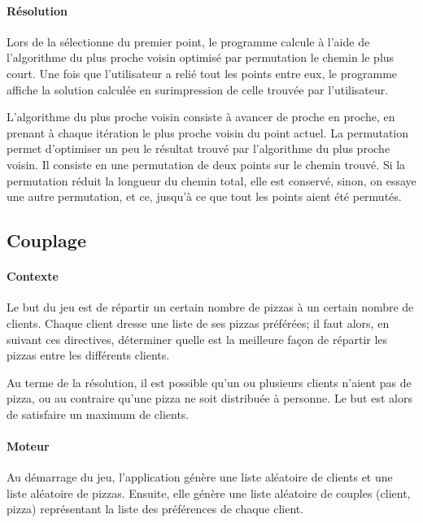         \paragraph{Résolution}
            Lors de la sélectionne du premier point,
            le programme calcule à l'aide de l'algorithme
            du plus proche voisin optimisé par permutation
            le chemin le plus court.
            Une fois que l'utilisateur a relié tout les points
            entre eux, le programme affiche la solution calculée
            en surimpression de celle trouvée par l'utilisateur.

            L'algorithme du plus proche voisin consiste à avancer
            de proche en proche, en prenant à chaque itération le plus
            proche voisin du point actuel.
            La permutation permet d'optimiser un peu le résultat trouvé
            par l'algorithme du plus proche voisin.
            Il consiste en une permutation de deux points sur le chemin trouvé.
            Si la permutation réduit la longueur du chemin total,
            elle est conservé, sinon, on essaye une autre permutation,
            et ce, jusqu'à ce que tout les points aient été permutés.
        
	\subsection{Couplage}
		\paragraph{Contexte}
			Le but du jeu est de répartir un certain nombre de pizzas à un certain nombre de
			 clients. Chaque client dresse une liste de ses pizzas préférées; il faut alors,
			 en suivant ces directives, déterminer quelle est la meilleure façon de répartir
			 les pizzas entre les différents clients.

			Au terme de la résolution, il est possible qu'un ou plusieurs clients n'aient pas
			 de pizza, ou au contraire qu'une pizza ne soit distribuée à personne. Le but est
			 alors de satisfaire un maximum de clients.
		\paragraph{Moteur}
			Au démarrage du jeu, l'application génère une liste aléatoire de clients et une
			 liste aléatoire de pizzas. Ensuite, elle génère une liste aléatoire de couples
			 (client, pizza) représentant la liste des préférences de chaque client.

